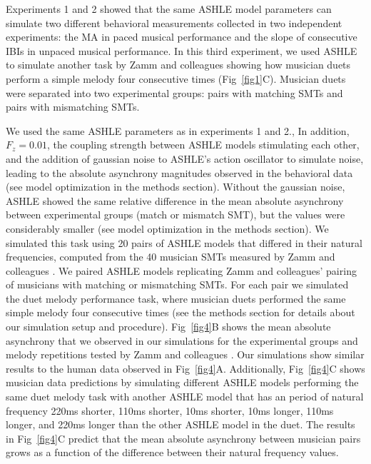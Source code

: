 \documentclass[10pt,letterpaper]{article}
\begin{document}
Experiments 1 and 2 showed that the same ASHLE model parameters can simulate two different behavioral measurements collected in two independent experiments: the MA in paced musical performance and the slope of consecutive IBIs in unpaced musical performance. In this third experiment, we used ASHLE to simulate another task by Zamm and colleagues \cite{zamm2016endogenous} showing how musician duets perform a simple melody four consecutive times (Fig~\ref{fig1}C). Musician duets were separated into two experimental groups: pairs with matching SMTs and pairs with mismatching SMTs. 

We used the same ASHLE parameters as in experiments 1 and 2., In addition, $F_z = 0.01$, the coupling strength between ASHLE models stimulating each other, and the addition of gaussian noise to ASHLE's action oscillator to simulate noise, leading to the absolute asynchrony magnitudes observed in the behavioral data (see model optimization in the methods section). Without the gaussian noise, ASHLE showed the same relative difference in the mean absolute asynchrony between experimental groups (match or mismatch SMT), but the values were considerably smaller (see model optimization in the methods section). We simulated this task using 20 pairs of ASHLE models that differed in their natural frequencies, computed from the 40 musician SMTs measured by Zamm and colleagues \cite{zamm2016endogenous}. We paired ASHLE models replicating Zamm and colleagues' \cite{zamm2016endogenous} pairing of musicians with matching or mismatching SMTs. For each pair we simulated the duet melody performance task, where musician duets performed the same simple melody four consecutive times (see the methods section for details about our simulation setup and procedure). Fig~\ref{fig4}B shows the mean absolute asynchrony that we observed in our simulations for the experimental groups and melody repetitions tested by Zamm and colleagues \cite{zamm2016endogenous}. Our simulations show similar results to the human data observed in Fig~\ref{fig4}A. Additionally, Fig~\ref{fig4}C shows musician data predictions by simulating different ASHLE models performing the same duet melody task with another ASHLE model that has an period of natural frequency 220ms shorter, 110ms shorter, 10ms shorter, 10ms longer, 110ms longer, and 220ms longer than the other ASHLE model in the duet. The results in Fig~\ref{fig4}C predict that the mean absolute asynchrony between musician pairs grows as a function of the difference between their natural frequency values. 
\end{document}
